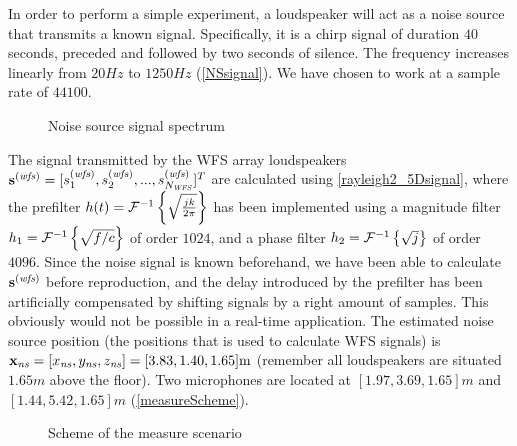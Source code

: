 In order to perform a simple experiment, a loudspeaker will act as a noise source that transmits a known signal. Specifically, it is a chirp signal of duration $40$ seconds, preceded and followed by two seconds of silence. The frequency increases linearly from $20 \si{Hz}$ to $1250\si{Hz}$ (\autoref{NSsignal}). We have chosen to work at a sample rate of $44100$.
\begin{figure}[h]
	\centering
	\def\svgwidth{0.4\columnwidth}
	\graphicspath{{Img/}}
	{\fontsize{5}{12}\selectfont
		
	}
	\caption{Noise source signal spectrum}
	\label{NSsignal}
\end{figure}

The signal transmitted by the WFS array loudspeakers $\vec{\signal[wfs][time]} = [\signal[wfs][time]_1, \signal[wfs][time]_2, ..., \signal[wfs][time]_{\numWFS}]^T$ are calculated using \autoref{rayleigh2_5Dsignal}, where the prefilter $\freqFilter(t) = \FourierTransform{\sqrt{\frac{jk}{2\pi}}}[inverse]$ has been implemented using a magnitude filter $\freqFilter[time][magnitude] = \FourierTransform{\sqrt{f/c}}[inverse]$ of order $1024$, and a phase filter $\freqFilter[time][phase] = \FourierTransform{\sqrt{j}}[inverse]$ of order $4096$. Since the noise signal is known beforehand, we have been able to calculate $\vec{\signal[wfs][time]}$ before reproduction, and the delay introduced by the prefilter has been artificially compensated by shifting signals by a right amount of samples. This obviously would not be possible in a real-time application. The estimated noise source position (the positions that is used to calculate WFS signals) is $\Position[ns] = [\Position[ns][x], \Position[ns][y], \Position[ns][z]] = [3.83, 1.40, 1.65] \si{m}$ (remember all loudspeakers are situated $1.65\si{m}$ above the floor). Two microphones are located at $[1.97, 3.69, 1.65] \si{m}$ and $[1.44, 5.42, 1.65] \si{m}$ (\autoref{measureScheme}).

\begin{figure}[h]
	\centering
	\caption{Scheme of the measure scenario}
	\label{measureScheme}
\end{figure}

